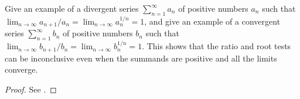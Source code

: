 \begin{ex}\label{i:ex:7.5.3}
  Give an example of a divergent series \(\sum_{n = 1}^\infty a_n\) of positive numbers \(a_n\) such that \(\lim_{n \to \infty} a_{n + 1} / a_n = \lim_{n \to \infty} a_n^{1 / n} = 1\), and give an example of a convergent series \(\sum_{n = 1}^\infty b_n\) of positive numbers \(b_n\) such that \(\lim_{n \to \infty} b_{n + 1} / b_n = \lim_{n \to \infty} b_n^{1 / n} = 1\).
  This shows that the ratio and root tests can be inconclusive even when the summands are positive and all the limits converge.
\end{ex}

\begin{proof}
  See .
\end{proof}
